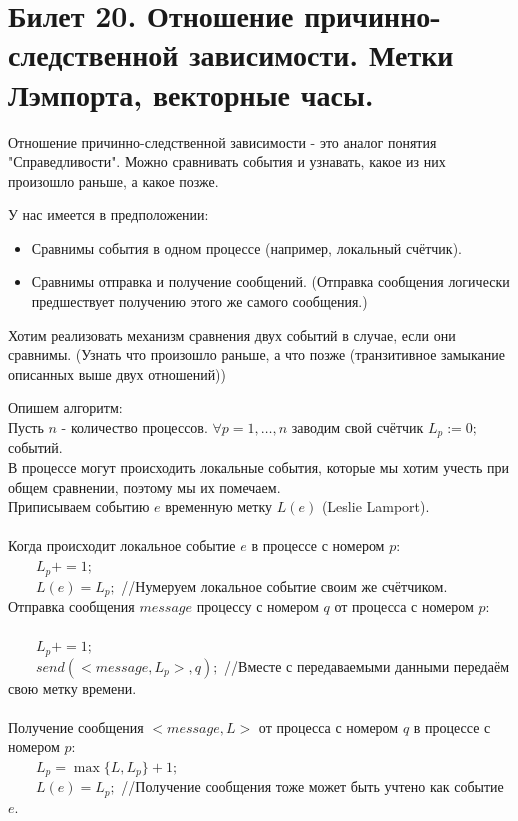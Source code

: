\newpage
\section {Билет 20. Отношение причинно-следственной зависимости. Метки Лэмпорта, векторные часы.}
Отношение причинно-следственной зависимости - это аналог понятия "Справедливости". Можно сравнивать события и узнавать, какое из них произошло раньше, а какое позже.

У нас имеется в предположении:
\begin{itemize}
	\item Сравнимы события в одном процессе (например, локальный счётчик).
	\item Сравнимы отправка и получение сообщений. (Отправка сообщения логически предшествует получению этого же самого сообщения.)
\end{itemize}
Хотим реализовать механизм сравнения двух событий в случае, если они сравнимы. (Узнать что произошло раньше, а что позже (транзитивное замыкание описанных выше двух отношений))

Опишем алгоритм:\\
Пусть $n$ - количество процессов. $\forall p = 1, \ldots, n$ заводим свой счётчик $L_p := 0;$ событий.\\
В процессе могут происходить локальные события, которые мы хотим учесть при общем сравнении, поэтому мы их помечаем.\\
Приписываем событию $e$ временную метку $L(e)$ (Leslie Lamport).\\ \\
Когда происходит локальное событие $e$ в процессе с номером $p$:\\
\ \ \ \ $L_p += 1;$\\
\ \ \ \ $L(e) = L_p;$ //Нумеруем локальное событие своим же счётчиком. \\
Отправка сообщения $message$ процессу с номером $q$ от процесса с номером $p$:\\ \\
\ \ \ \ $L_p += 1;$\\
\ \ \ \ $send(<message, L_p>, q);$ //Вместе с передаваемыми данными передаём свою метку времени.\\ \\
Получение сообщения $<message, L>$ от процесса с номером $q$ в  процессе с номером $p$:\\ 
\ \ \ \ $L_p = \max\{L,L_p\} + 1;$\\
\ \ \ \ $L(e) = L_p;$ //Получение сообщения тоже может быть учтено как событие $e$. \\

